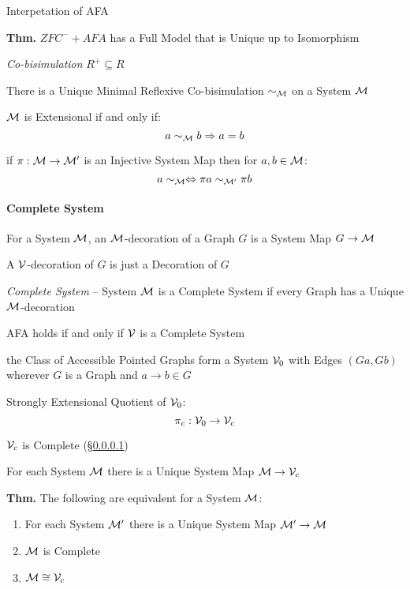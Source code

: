 Interpetation of AFA %

\textbf{Thm.} $ZFC^- + AFA$ has a Full Model that is Unique up to
Isomorphism

\emph{Co-bisimulation} $R^+ \subseteq R$

There is a Unique Minimal Reflexive Co-bisimulation $\sim_\mathcal{M}$
on a System $\mathcal{M}$

$\mathcal{M}$ is Extensional if and only if:
\[
  a \sim_\mathcal{M} b \Rightarrow a = b
\]

if $\pi : \mathcal{M} \rightarrow \mathcal{M}'$ is an Injective System Map
then for $a,b \in \mathcal{M}$:
\[
  a \sim_\mathcal{M} \Leftrightarrow \pi a \sim_{\mathcal{M}'} \pi b
\]



\paragraph{Complete System}\label{sec:complete_system}\hfill

For a System $\mathcal{M}$, an $\mathcal{M}$-decoration of a Graph $G$ is
a System Map $G \rightarrow \mathcal{M}$

A $\mathcal{V}$-decoration of $G$ is just a Decoration of $G$

\emph{Complete System} -- System $\mathcal{M}$ is a Complete System if
every Graph has a Unique $\mathcal{M}$-decoration

AFA holds if and only if $\mathcal{V}$ is a Complete System

the Class of Accessible Pointed Graphs form a System $\mathcal{V}_0$
with Edges $(G a, G b)$ wherever $G$ is a Graph and $a \rightarrow b
\in G$

Strongly Extensional Quotient of $\mathcal{V}_0$:
\[
  \pi_c : \mathcal{V}_0 \rightarrow \mathcal{V}_c
\]

$\mathcal{V}_c$ is Complete (\S\ref{sec:complete_system})

For each System $\mathcal{M}$ there is a Unique System Map $\mathcal{M}
\rightarrow \mathcal{V}_c$

\textbf{Thm.} The following are equivalent for a System $\mathcal{M}$:
\begin{enumerate}
  \item For each System $\mathcal{M}'$ there is a Unique System Map
    $\mathcal{M}' \rightarrow \mathcal{M}$
  \item $\mathcal{M}$ is Complete
  \item $\mathcal{M} \cong \mathcal{V}_c$
\end{enumerate}

